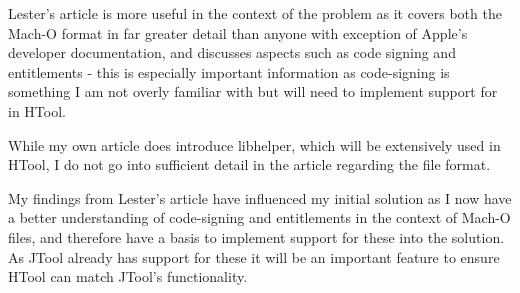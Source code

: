
Lester's article is more useful in the context of the problem as it covers both the Mach-O format in far greater detail than anyone with exception of Apple's developer documentation, and discusses aspects such as code signing and entitlements - this is especially important information as code-signing is something I am not overly familiar with but will need to implement support for in HTool.

While my own article does introduce libhelper, which will be extensively used in HTool, I do not go into sufficient detail in the article regarding the file format.


My findings from Lester's article have influenced my initial solution as I now have a better understanding of code-signing and entitlements in the context of Mach-O files, and therefore have a basis to implement support for these into the solution. As JTool already has support for these it will be an important feature to ensure HTool can match JTool's functionality.





